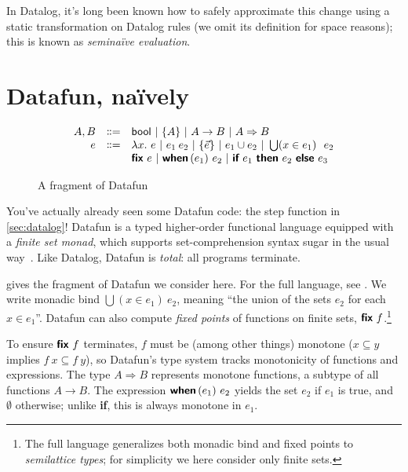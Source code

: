\documentclass[sigplan,screen,dvipsnames]{acmart}
\newcommand{\naive}{na\"ive}
\newcommand{\bnfeq}{\dblcolon=}
\newcommand{\bnfcont}{}
\newcommand{\pipe}{~|~}
\newcommand{\fn}{\lambda}
\newcommand{\binder}{.~}
\newcommand{\bind}[1]{#1\binder}
\newcommand{\fnof}[1]{\fn\bind{#1}}
\newcommand{\kw}[1]{\textsf{\bfseries #1}}
\newcommand{\tlv}[1]{\textsf{#1}}
\newcommand{\mto}{\overset{+}{\to}}
\renewcommand{\mto}{\Rightarrow}
\newcommand{\tset}[1]{\{#1\}}
\newcommand{\tbool}{\textsf{bool}}
\newcommand{\eset}[1]{\{#1\}}
\newcommand{\ewhen}[1]{\kw{when}\,(#1)~}
\newcommand{\eif}[2]{\kw{if}~#1~\kw{then}~#2~\kw{else}~}
\newcommand{\efor}[1]{\bigcup(#1)~}
\newcommand{\efix}{\kw{fix}~}
\begin{document}

In Datalog, it's long been known how to safely approximate this change using a
static transformation on Datalog rules (we omit its definition for space
reasons); this is known as \emph{semi\naive{} evaluation}.


\section{Datafun, na\"ively}

\begin{figure}
  \[
  \begin{array}{rcl}
    A,B &\bnfeq& \tbool \pipe \tset{A} \pipe A \to B \pipe A \mto B
    \\
    e &\bnfeq& \fnof{x} e \pipe e_1\:e_2 \pipe \eset{\vec{e}} \pipe e_1 \cup e_2
    \pipe \efor{x \in e_1}~ e_2
    \\ &\bnfcont&  \efix e \pipe \ewhen{e_1} e_2 \pipe \eif{e_1}{e_2}{e_3}
  \end{array}
  \]\vspace{-1em}
  \caption{A fragment of Datafun}
  \label{fig:datafun}
\end{figure}

You've actually already seen some Datafun code: the \tlv{step} function in
\cref{sec:datalog}! Datafun is a typed higher-order functional language equipped
with a \emph{finite set monad}, which supports set-comprehension syntax sugar in
the usual way~\cite{comprehending-monads}. Like Datalog, Datafun is
\emph{total}: all programs terminate.

 gives the fragment of Datafun we consider here. For the full
language, see \citet{datafun}. We write monadic bind $\efor{x \in e_1} e_2$,
meaning ``the union of the sets $e_2$ for each $x \in e_1$''.
%
Datafun can also compute \emph{fixed points} of functions on finite sets, $\efix
f$.\footnote{The full language generalizes both monadic bind and fixed points to
  \emph{semilattice types}; for simplicity we here consider only finite sets.}

To ensure $\efix f$ terminates, $f$ must be (among other things) monotone ($x
\subseteq y$ implies $f\:x \subseteq f\:y$), so Datafun's type system tracks
monotonicity of functions and expressions.
%
The type $A \mto B$ represents monotone functions, a subtype of all functions $A
\to B$. The expression $\ewhen{e_1}{e_2}$ yields the set $e_2$ if $e_1$ is true,
and $\emptyset$ otherwise; unlike \kw{if}, this is always monotone in $e_1$.
\end{document}
